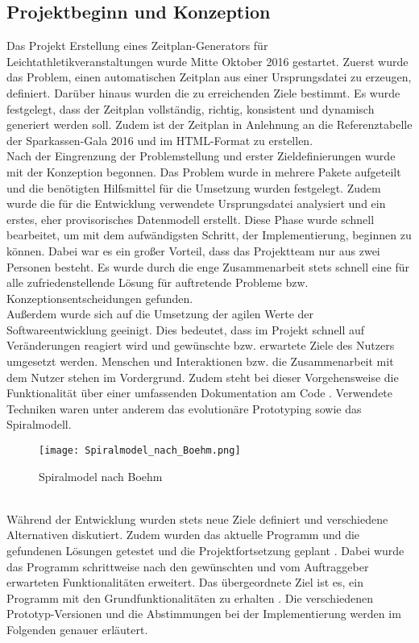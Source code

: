\subsection{Projektbeginn und Konzeption}
Das Projekt Erstellung eines Zeitplan-Generators für Leichtathletikveranstaltungen wurde Mitte Oktober 2016 gestartet. Zuerst wurde das Problem, einen automatischen Zeitplan aus einer Ursprungsdatei zu erzeugen, definiert. Darüber hinaus wurden die zu erreichenden Ziele bestimmt. Es wurde festgelegt, dass der Zeitplan vollständig, richtig, konsistent und dynamisch generiert werden soll. Zudem ist der Zeitplan in Anlehnung an die Referenztabelle der Sparkassen-Gala 2016 und im HTML-Format zu erstellen.\\
Nach der Eingrenzung der Problemstellung und erster Zieldefinierungen wurde mit der Konzeption begonnen. Das Problem wurde in mehrere Pakete aufgeteilt und die benötigten Hilfsmittel für die Umsetzung wurden festgelegt. Zudem wurde die für die Entwicklung verwendete Ursprungsdatei analysiert und ein erstes, eher provisorisches Datenmodell erstellt.
Diese Phase wurde schnell bearbeitet, um mit dem aufwändigsten Schritt, der Implementierung, beginnen zu können. Dabei war es ein großer Vorteil, dass das Projektteam nur aus zwei Personen besteht. Es wurde durch die enge Zusammenarbeit stets schnell eine für alle zufriedenstellende Lösung für auftretende Probleme bzw. Konzeptionsentscheidungen gefunden.\\
Außerdem wurde sich auf die Umsetzung der agilen Werte der Softwareentwicklung geeinigt. Dies bedeutet, dass im Projekt schnell auf Veränderungen reagiert wird und gewünschte bzw. erwartete Ziele des Nutzers umgesetzt werden. Menschen und Interaktionen bzw. die Zusammenarbeit mit dem Nutzer stehen im Vordergrund. Zudem steht bei dieser Vorgehensweise die Funktionalität über einer umfassenden Dokumentation am Code \cite{agilewerte}. Verwendete Techniken waren unter anderem das evolutionäre Prototyping sowie das Spiralmodell.
\begin{figure}[htbp]
  \centering
  \texttt{[image: Spiralmodel\_nach\_Boehm.png]}
  \caption{Spiralmodel nach Boehm}
  \label{fig:Fig1}
\end{figure}\\
Während der Entwicklung wurden stets neue Ziele definiert und verschiedene Alternativen diskutiert. Zudem wurden das aktuelle Programm und die gefundenen Lösungen getestet und die Projektfortsetzung geplant \cite{spiralmodell}. Dabei wurde das Programm schrittweise nach den gewünschten und vom Auftraggeber erwarteten Funktionalitäten erweitert. Das übergeordnete Ziel ist es, ein Programm mit den Grundfunktionalitäten zu erhalten \cite{prototyping}. Die verschiedenen Prototyp-Versionen und die Abstimmungen bei der Implementierung werden im Folgenden genauer erläutert.

